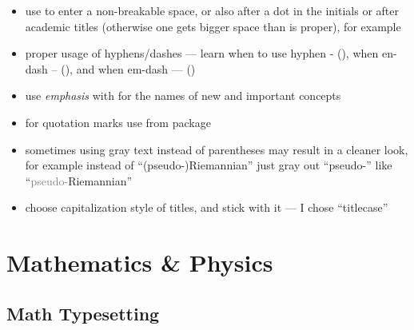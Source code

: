 \begin{itemize}
    \item use \macro{~} to enter a non-breakable space, or also after a dot in the initials or after academic titles
          (otherwise one gets bigger space than is proper), for example 
    \item proper usage of hyphens/dashes --- learn when to use hyphen - (\macro{-}), when en-dash -- (\macro{--}), and when em-dash --- (\macro{---})
    \item use \emph{emphasis} with \macro{\emph} for the names of new and important concepts
    \item for quotation marks use \macro{\enquote} from  package
    \item sometimes using gray text instead of parentheses may result in a cleaner look, for example instead of \enquote{(pseudo-)Riemannian} just gray out \enquote{pseudo-} like \enquote{\textcolor{gray}{pseudo-}Riemannian}
    \item choose capitalization style of titles, and stick with it --- I chose \enquote{titlecase}
\end{itemize}


\section{Mathematics \& Physics}%
\label{sec:MathematicsandPhysics}

\subsection{Math Typesetting}%
\label{sub:Math Typesetting}

